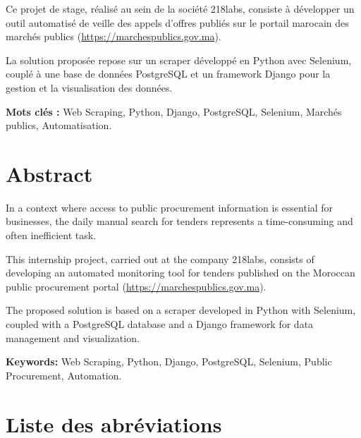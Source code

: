 \documentclass[12pt,a4paper]{report}
\begin{document}
Ce projet de stage, réalisé au sein de la société 218labs, consiste à développer un outil automatisé de veille des appels d'offres publiés sur le portail marocain des marchés publics (\url{https://marchespublics.gov.ma}).

La solution proposée repose sur un scraper développé en Python avec Selenium, couplé à une base de données PostgreSQL et un framework Django pour la gestion et la visualisation des données.

\textbf{Mots clés :} Web Scraping, Python, Django, PostgreSQL, Selenium, Marchés publics, Automatisation.

\chapter*{Abstract}

In a context where access to public procurement information is essential for businesses, the daily manual search for tenders represents a time-consuming and often inefficient task.

This internship project, carried out at the company 218labs, consists of developing an automated monitoring tool for tenders published on the Moroccan public procurement portal (\url{https://marchespublics.gov.ma}).

The proposed solution is based on a scraper developed in Python with Selenium, coupled with a PostgreSQL database and a Django framework for data management and visualization.

\textbf{Keywords:} Web Scraping, Python, Django, PostgreSQL, Selenium, Public Procurement, Automation.

\chapter*{Liste des abréviations}

\begin{acronym}
\end{acronym}
\end{document}
